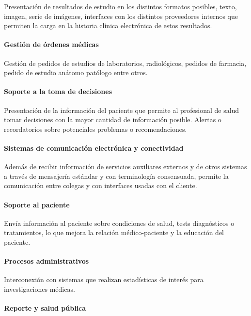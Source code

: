 Presentación de resultados de estudio en los distintos formatos posibles, texto, imagen, serie de imágenes, interfaces con los distintos proveedores internos que permiten la carga en la historia clínica electrónica de estos resultados.

\paragraph{Gestión de órdenes médicas}

Gestión de pedidos de estudios de laboratorios, radiológicos, pedidos de farmacia, pedido de estudio anátomo patólogo entre otros. 

\paragraph{Soporte a la toma de decisiones}

Presentación de la información del paciente que permite al profesional de salud tomar decisiones con la mayor cantidad de información posible. Alertas o recordatorios sobre potenciales problemas o recomendaciones.

\paragraph{Sistemas de comunicación electrónica y conectividad}

Además de recibir información de servicios auxiliares externos y de otros sistemas a través de mensajería estándar y con terminología consensuada, permite la comunicación entre colegas y con interfaces usadas con el cliente.

\paragraph{Soporte al paciente}

Envía información al paciente sobre condiciones de salud, tests diagnósticos o tratamientos, lo que mejora la relación médico-paciente y la educación del paciente.

\paragraph{Procesos administrativos}

Interconexión con sistemas que realizan estadísticas de interés para investigaciones médicas.

\paragraph{Reporte y salud pública}

